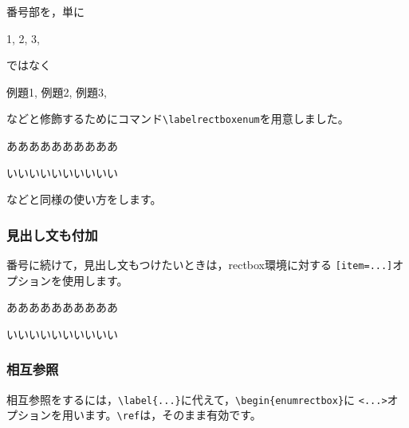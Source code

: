 \subsubsection{}
番号部を，単に
\begin{jquote}
1, 2, 3, \Cdots
\end{jquote}
ではなく
\begin{jquote}
例題1, 例題2, 例題3, \Cdots
\end{jquote}
などと修飾するためにコマンド\verb+\labelrectboxenum+を用意しました。

\begin{showEx}{}
\def\labelrectboxenum{%
例題\arabic{rectboxenum}}
\begin{enumrectbox}
ああああああああああ
\end{enumrectbox}

\begin{enumrectbox}
いいいいいいいいいい
\end{enumrectbox}
\end{showEx}

などと同様の使い方をします。

\subsubsection{見出し文も付加}
番号に続けて，見出し文もつけたいときは，\textsf{rectbox}環境に対する
\verb+[item=...]+オプションを使用します。

\begin{showEx}{}
\def\labelrectboxenum{%
例題\arabic{rectboxenum}.~}
\begin{enumrectbox}[item=アアア]
ああああああああああ
\end{enumrectbox}

\begin{enumrectbox}[item=イイイ]
いいいいいいいいいい
\end{enumrectbox}
\end{showEx}
\newpage

\subsubsection{相互参照}
相互参照をするには，\verb+\label{...}+に代えて，\verb+\begin{enumrectbox}+に
\verb+<...>+オプションを用います。\verb+\ref+は，そのまま有効です。

